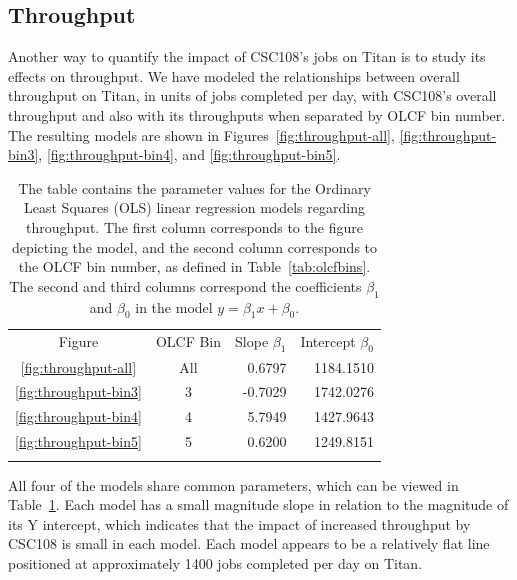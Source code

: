 \subsection{Throughput}
\label{subsec:throughput}

Another way to quantify the impact of CSC108's jobs on Titan is to study its
effects on throughput. We have modeled the relationships between overall
throughput on Titan, in units of jobs completed per day, with CSC108's overall
throughput and also with its throughputs when separated by OLCF bin number. The
resulting models are shown in Figures~\ref{fig:throughput-all},
\ref{fig:throughput-bin3}, \ref{fig:throughput-bin4}, and
\ref{fig:throughput-bin5}.

\begin{table}
\caption{The table contains the parameter values for the Ordinary Least Squares
(OLS) linear regression models regarding throughput. The first column 
corresponds to the figure depicting the model, and the second column
corresponds to the OLCF bin number, as defined in Table~\ref{tab:olcfbins}. The
second and third columns correspond the coefficients $\beta_1$ and $\beta_0$ in
the model $y = \beta_{1}x + \beta_0$.}
\label{tab:throughput-params}       %
\begin{tabular}{ccrr}
\hline\noalign{\smallskip}
Figure & OLCF Bin & Slope $\beta_1$  & Intercept $\beta_0$  \\
\noalign{\smallskip}\hline\noalign{\smallskip}
\ref{fig:throughput-all}    &   All &   0.6797  &   1184.1510   \\
\ref{fig:throughput-bin3}   &   3   &  -0.7029  &   1742.0276   \\
\ref{fig:throughput-bin4}   &   4   &   5.7949  &   1427.9643   \\
\ref{fig:throughput-bin5}   &   5   &   0.6200  &   1249.8151   \\
\noalign{\smallskip}\hline
\end{tabular}
\end{table}

All four of the models share common parameters, which can be viewed in
Table~\ref{tab:throughput-params}. Each model has a small magnitude slope in
relation to the magnitude of its Y intercept, which indicates that the impact
of increased throughput by CSC108 is small in each model. Each model appears to
be a relatively flat line positioned at approximately 1400 jobs completed per
day on Titan.

